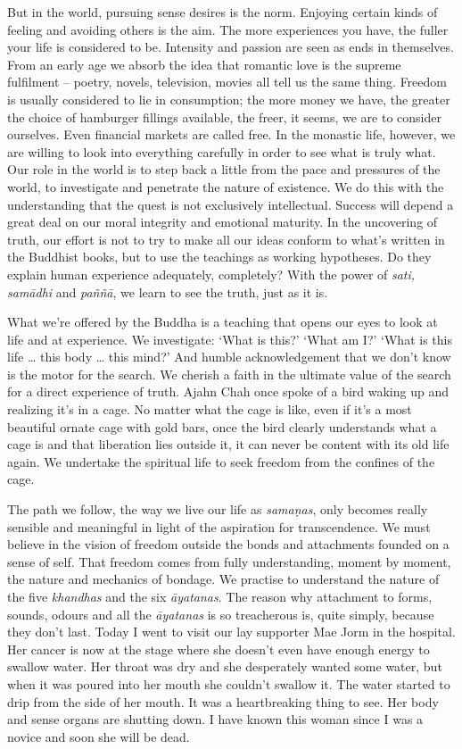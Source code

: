 But in the world, pursuing sense desires is the norm. Enjoying certain
kinds of feeling and avoiding others is the aim. The more experiences
you have, the fuller your life is considered to be. Intensity and
passion are seen as ends in themselves. From an early age we absorb the
idea that romantic love is the supreme fulfilment -- poetry, novels, 
television, movies all tell us the same thing. Freedom is usually
considered to lie in consumption; the more money we have, the greater
the choice of hamburger fillings available, the freer, it seems, we are
to consider ourselves. Even financial markets are called free. In the
monastic life, however, we are willing to look into everything carefully
in order to see what is truly what. Our role in the world is to step
back a little from the pace and pressures of the world, to investigate
and penetrate the nature of existence. We do this with the understanding
that the quest is not exclusively intellectual. Success will depend a
great deal on our moral integrity and emotional maturity. In the
uncovering of truth, our effort is not to try to make all our ideas
conform to what's written in the Buddhist books, but to use the
teachings as working hypotheses. Do they explain human experience
adequately, completely? With the power of \emph{sati, samādhi} and
\emph{paññā}, we learn to see the truth, just as it is. 

What we're offered by the Buddha is a teaching that opens our eyes to
look at life and at experience. We investigate: `What is this?' `What am
I?' `What is this life \ldots{} this body \ldots{} this mind?' And
humble acknowledgement that we don't know is the motor for the search. 
We cherish a faith in the ultimate value of the search for a direct
experience of truth. Ajahn Chah once spoke of a bird waking up and
realizing it's in a cage. No matter what the cage is like, even if it's
a most beautiful ornate cage with gold bars, once the bird clearly
understands what a cage is and that liberation lies outside it, it can
never be content with its old life again. We undertake the spiritual
life to seek freedom from the confines of the cage. 

The path we follow, the way we live our life as \emph{samaṇas}, only
becomes really sensible and meaningful in light of the aspiration for
transcendence. We must believe in the vision of freedom outside the
bonds and attachments founded on a sense of self. That freedom comes
from fully understanding, moment by moment, the nature and mechanics of
bondage. We practise to understand the nature of the five
\emph{khandhas} and the six \emph{āyatanas}. The reason why attachment
to forms, sounds, odours and all the \emph{āyatanas} is so treacherous
is, quite simply, because they don't last. Today I went to visit our lay
supporter Mae Jorm in the hospital. Her cancer is now at the stage where
she doesn't even have enough energy to swallow water. Her throat was dry
and she desperately wanted some water, but when it was poured into her
mouth she couldn't swallow it. The water started to drip from the side
of her mouth. It was a heartbreaking thing to see. Her body and sense
organs are shutting down. I have known this woman since I was a novice
and soon she will be dead. 

